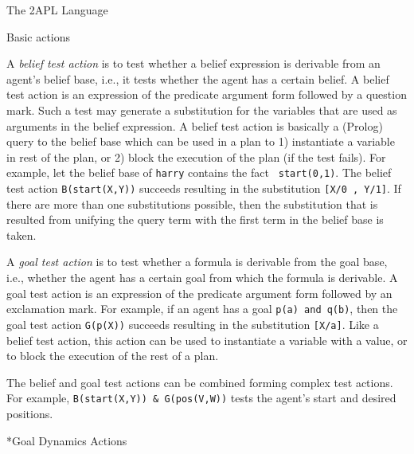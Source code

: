 \begin{chapter}{The 2APL Language}
\begin{section}{Basic actions}
\begin{subsection}
A \emph{belief test action} is to test whether a belief expression
is derivable from an agent's belief base, i.e., it tests whether the
agent has a certain belief. A belief test action  is
an expression of the predicate argument form followed by a question
mark. Such a test may generate a substitution for the variables that
are used as arguments in the belief expression. A belief test action
is basically a (Prolog) query to the belief base which can be used
in a plan to 1) instantiate a variable in rest of the plan, or 2)
block the execution of the plan (if the test fails). For example,
let the belief base of {\tt harry} contains the fact {\tt
start(0,1)}. The belief test action {\tt B(start(X,Y))} succeeds
resulting in the substitution {\tt [X/0 , Y/1]}. If there are more
than one substitutions possible, then the substitution that is
resulted from unifying the query term with the first term in the
belief base is taken.

A \emph{goal test action} is to test whether a formula is derivable
from the goal base, i.e., whether the agent has a certain goal from
which the formula is derivable. A goal test action  is
an expression of the predicate argument form followed by an
exclamation mark. For example, if an agent has a goal {\tt p(a) and
q(b)}, then the goal test action {\tt G(p(X))} succeeds resulting in
the substitution {\tt [X/a]}. Like a belief test action, this action
can be used to instantiate a variable with a value, or to block the
execution of the rest of a plan.

The belief and goal test actions can be combined forming complex
test actions. For example, {\tt B(start(X,Y)) \& G(pos(V,W))} tests
the agent's start and desired positions.
\end{subsection}

\begin{subsection}*{Goal Dynamics Actions}\label{sec:goaldyn}


\end{subsection}
\end{section}
\end{chapter}
